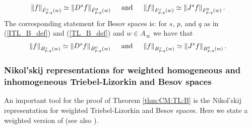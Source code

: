  \begin{align*}
 & \norm{f}{\tlw{p}{s}{q}{w}}\simeq\norm{D^s f}{\tlw{p}{0}{q}{w}} \quad \text{ and } \quad \norm{f}{\itlw{p}{s}{q}{w}}\simeq\norm{J^s f}{\itlw{p}{0}{q}{w}}.
 \end{align*}
The corresponding statement for Besov spaces is: for $s$, $p$, and $q$ as in (\ref{ITL_B_def}) and (\ref{TL_B_def}) and $w\in A_\infty$ we have that 
 \begin{align*}
 & \norm{f}{\besw{p}{s}{q}{w}}\simeq\norm{D^s f}{\besw{p}{0}{q}{w}} \quad \text{ and } \quad \norm{f}{\ibesw{p}{s}{q}{w}}\simeq\norm{J^s f}{\ibesw{p}{0}{q}{w}}.
 \end{align*}
 

  

\subsubsection{Nikol'skij representations for weighted homogeneous and inhomogeneous Triebel-Lizorkin and Besov spaces}

An important tool for the proof of Theorem \ref{thm:CM:TL:B} is the Nikol'skij representation for weighted Triebel-Lizorkin and Besov spaces. Here we state a weighted version of \cite[Theorem 3.7]{MR837335} (see also \cite[Section 2.5.2]{MR3024598}). 

